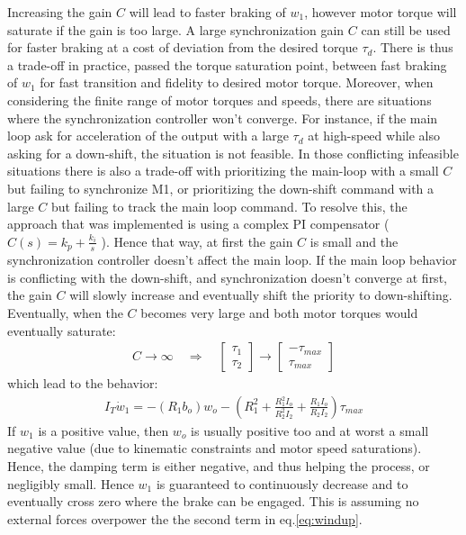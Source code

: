 Increasing the gain $C$ will lead to faster braking of $w_1$, however motor torque will saturate if the gain is too large. A large synchronization gain $C$ can still be used for faster braking at a cost of deviation from the desired torque $\tau_d$. There is thus a trade-off in practice, passed the torque saturation point, between fast braking of $w_1$ for fast transition and fidelity to desired motor torque. Moreover, when considering the finite range of motor torques and speeds, there are situations where the synchronization controller won't converge. For instance, if the main loop ask for acceleration of the output with a large $\tau_d$ at high-speed while also asking for a down-shift, the situation is not feasible. In those conflicting infeasible situations there is also a trade-off with prioritizing the main-loop with a small $C$ but failing to synchronize M1, or prioritizing the down-shift command with a large $C$ but failing to track the main loop command. To resolve this, the approach that was implemented is using a complex PI compensator ( $C(s) = k_p + \frac{k_i}{s}$ ). Hence that way, at first the gain $C$ is small and the synchronization controller doesn't affect the main loop. If the main loop behavior is conflicting with the down-shift, and synchronization doesn't converge at first, the gain $C$ will slowly increase and eventually shift the priority to down-shifting. Eventually, when the $C$ becomes very large and both motor torques would eventually saturate:%
%
\begin{align}
C \rightarrow \infty \quad\Rightarrow\quad 
\left[ \begin{array}{c}
\tau_1 \\ \tau_2
\end{array} \right] \rightarrow
\left[ \begin{array}{c}
-\tau_{max} \\ \tau_{max}
\end{array} \right]
\end{align}
%
which lead to the behavior:
%
\begin{align}
I_T \dot{w}_1 = - \left( R_1 b_o \right) w_o  - \left( R_1^2 + \frac{R_1^2 I_o }{R_2^2 I_2} + \frac{R_1 I_o}{R_2 I_2} \right) \tau_{max}
\label{eq:windup}
\end{align}
%
If $w_1$ is a positive value, then $w_o$ is usually positive too and at worst a small negative value (due to kinematic constraints and motor speed saturations). Hence, the damping term is either negative, and thus helping the process, or negligibly small. Hence $w_1$ is guaranteed to continuously decrease and to eventually cross zero where the brake can be engaged. This is assuming no external forces overpower the the second term in eq.\eqref{eq:windup}.
